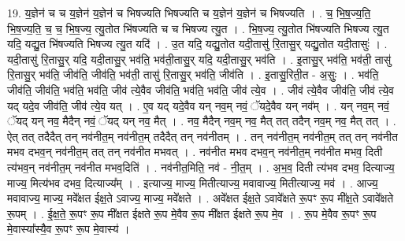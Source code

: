 \documentclass[17pt]{extarticle}
\begin{document}
19. य॒ज्ञेन॑ च च य॒ज्ञेन॑ य॒ज्ञेन॑ च भिषज्यति भिषज्यति च य॒ज्ञेन॑ य॒ज्ञेन॑ च भिषज्यति । . च॒ भि॒ष॒ज्य॒ति॒ भि॒ष॒ज्य॒ति॒ च॒ च॒ भि॒ष॒ज्य॒ त्यु॒तोत भि॑षज्यति च च भिषज्य त्यु॒त । . भि॒ष॒ज्य॒ त्यु॒तोत भि॑षज्यति भिषज्य त्यु॒त यदि॒ यद्यु॒त भि॑षज्यति भिषज्य त्यु॒त यदि॑ । . उ॒त यदि॒ यद्यु॒तोत यदी॒तासु॑ रि॒तासु॒र् यद्यु॒तोत यदी॒तासुः॑ । . यदी॒तासु॑ रि॒तासु॒र् यदि॒ यदी॒तासु॒र् भव॑ति॒ भव॑ती॒तासु॒र् यदि॒ यदी॒तासु॒र् भव॑ति । . इ॒तासु॒र् भव॑ति॒ भव॑ती॒ तासु॑ रि॒तासु॒र् भव॑ति॒ जीव॑ति॒ जीव॑ति॒ भव॑ती॒ तासु॑ रि॒तासु॒र् भव॑ति॒ जीव॑ति । . इ॒तासु॒रिती॒त - अ॒सुः॒ । . भव॑ति॒ जीव॑ति॒ जीव॑ति॒ भव॑ति॒ भव॑ति॒ जीव॑ त्ये॒वैव जीव॑ति॒ भव॑ति॒ भव॑ति॒ जीव॑ त्ये॒व । . जीव॑ त्ये॒वैव जीव॑ति॒ जीव॑ त्ये॒व यद् यदे॒व जीव॑ति॒ जीव॑ त्ये॒व यत् । . ए॒व यद् यदे॒वैव यन् नव॒म् नवं॒ ॅयदे॒वैव यन् नव᳚म् । . यन् नव॒म् नवं॒ ॅयद् यन् नव॒ मैदैन् नवं॒ ॅयद् यन् नव॒ मैत् । . नव॒ मैदैन् नव॒म् नव॒ मैत् तत् तदैन् नव॒म् नव॒ मैत् तत् । . ऐत् तत् तदैदैत् तन् नव॑नीत॒म् नव॑नीत॒म् तदैदैत् तन् नव॑नीतम् । . तन् नव॑नीत॒म् नव॑नीत॒म् तत् तन् नव॑नीत मभव दभव॒न् नव॑नीत॒म् तत् तन् नव॑नीत मभवत् । . नव॑नीत मभव दभव॒न् नव॑नीत॒म् नव॑नीत मभव॒ दिती त्य॑भव॒न् नव॑नीत॒म् नव॑नीत मभव॒दिति॑ । . नव॑नीत॒मिति॒ नव॑ - नी॒त॒म् । . अ॒भ॒व॒ दिती त्य॑भव दभव॒ दित्याज्य॒ माज्य॒ मित्य॑भव दभव॒ दित्याज्य᳚म् । . इत्याज्य॒ माज्य॒ मितीत्याज्य॒ मवावाज्य॒ मितीत्याज्य॒ मव॑ । . आज्य॒ मवावाज्य॒ माज्य॒ मवे᳚क्षत ईक्ष॒ते ऽवाज्य॒ माज्य॒ मवे᳚क्षते । . अवे᳚क्षत ईक्ष॒ते ऽवावे᳚क्षते रू॒पꣳ रू॒प मी᳚क्ष॒ते ऽवावे᳚क्षते रू॒पम् । . ई॒क्ष॒ते॒ रू॒पꣳ रू॒प मी᳚क्षत ईक्षते रू॒प मे॒वैव रू॒प मी᳚क्षत ईक्षते रू॒प मे॒व । . रू॒प मे॒वैव रू॒पꣳ रू॒प मे॒वास्या᳚स्यै॒व रू॒पꣳ रू॒प मे॒वास्य॑ । \newline
\end{document}
